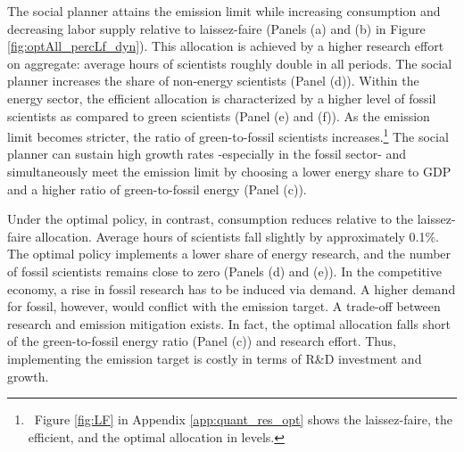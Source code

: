 \begin{figure}[h!!!]
\begin{subfigure}[]{1\textwidth}
\begin{subfigure}[]{0.4\textwidth}
\end{subfigure}
\end{subfigure}
\end{figure} 
%
The social planner attains the emission limit while increasing consumption and decreasing labor supply relative to laissez-faire (Panels (a) and (b) in Figure \ref{fig:optAll_percLf_dyn}). This allocation is achieved by a higher research effort on aggregate: average hours of scientists roughly double in all periods. The social planner increases the share of non-energy scientists (Panel (d)). Within the energy sector, the efficient allocation is characterized by a higher level of fossil scientists as compared to green scientists (Panel (e) and (f)). As the emission limit becomes stricter, the ratio of green-to-fossil scientists increases.\footnote{\ Figure \ref{fig:LF} in Appendix \ref{app:quant_res_opt}  shows the laissez-faire, the efficient, and the optimal allocation in levels.} 
The social planner can sustain high growth rates -especially in the fossil sector- and simultaneously meet the emission limit by choosing a lower energy share to GDP and a higher ratio of green-to-fossil energy (Panel (c)). 


Under the optimal policy, in contrast, consumption reduces relative to the laissez-faire allocation. Average hours of scientists fall slightly by approximately 0.1\%. The optimal policy implements a lower share of energy research, and the number of fossil scientists remains close to zero (Panels (d) and (e)).
In the competitive economy, a rise in fossil research has to be induced via demand. A higher demand for fossil, however, would conflict with the emission target. A trade-off between research and emission mitigation exists.  In fact, the optimal allocation falls short of the green-to-fossil energy ratio (Panel (c)) and research effort. Thus, implementing the emission target is costly in terms of R\&D investment and growth.

